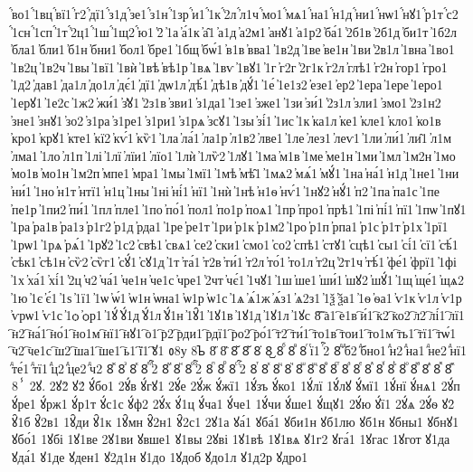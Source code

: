 {҆́во1
҆́1вц
҆́вї1
҆́г2
҆́дї1
҆́з1д
҆́зе1
҆́з1н
҆́1зр
҆́и1
҆́1к
҆́2л
҆́л1ч
҆́мо1
҆́мѧ1
҆́на1
҆́н1д
҆́ни1
҆́нѡ1
҆́нꙋ1
҆́р1т
҆́с2
҆́1сн
҆́1сп
҆́1т
҆́2ц1
҆́1ш
҆́1щ2
҆́ю1
҆2̑
҆1а
҆а́1к
҆а̑1
҆а1д
҆а2м1
҆анꙋ1
҆а1р2
҆ба́1
҆2б1в
҆2б1д
҆би1т
҆1б2л
҆бла1
҆бли1
҆б1н
҆бни1
҆бол1
҆бре1
҆1бщ
҆бѡ́1
҆в1в
҆вва1
҆1в2д
҆1ве
҆ве1н
҆1ви
҆2в1л
҆1вна
҆1во1
҆1в2ц
҆1в2ч
҆1вы
҆1вї1
҆1вѝ
҆1вѣ
҆вѣ1р
҆1вѧ
҆1вѵ
҆1вꙋ1
҆1г
҆г2г
҆2г1к
҆г2л
҆глѣ1
҆г2н
҆гор1
҆гро1
҆1д2
҆дав1
҆да1л
҆до1л
҆дє́1
҆дї1
҆дѡ1л
҆дѣ́1
҆дѣ1в
҆дꙋ́1
҆1е́
҆1е1з2
҆езе1
҆ер2
҆1ера
҆1ере
҆1еро1
҆1ерꙋ1
҆1е2с
҆1ж2
҆жи́1
҆з̾ꙋ1
҆2з1в
҆зви1
҆з1да1
҆1зе1
҆зже1
҆1зи
҆зи́1
҆2з1л
҆зли1
҆змо1
҆2з1н2
҆зне1
҆знꙋ1
҆зо2
҆з1ра
҆з1ре1
҆з1ри1
҆з1рѧ
҆зсꙋ1
҆1зы
҆зі́1
҆1ис
҆1к
҆ка1л
҆ке1
҆кле1
҆кло1
҆ко1в
҆кро1
҆крꙋ1
҆кте1
҆кї2
҆кѵ́1
҆кѷ1
҆1ла
҆ла́1
҆ла1р
҆л1в2
҆лве1
҆1ле
҆лез1
҆леѵ1
҆1ли
҆ли́1
҆ли̑1
҆л1м
҆лма1
҆1ло
҆л1п
҆1лі
҆1лї
҆лїи1
҆лїо1
҆1лѝ
҆1лѷ2
҆1лꙋ1
҆1ма
҆м1в
҆1ме
҆ме1н
҆1ми
҆1мл
҆1м2н
҆1мо
҆мо1в
҆мо1н
҆1м2п
҆мпе1
҆мра1
҆1мы
҆1мї1
҆1мѣ
҆мѣ̑1
҆1мѧ2
҆мѧ́1
҆мꙋ́1
҆1на
҆на́1
҆н1д
҆1не1
҆1ни
҆ни́1
҆1но
҆н1т
҆нтї1
҆н1ц
҆1ны
҆1ні
҆ні́1
҆нї1
҆1нѝ
҆1нѣ
҆н1ѳ
҆нѵ́1
҆1нꙋ2
҆нꙋ́1
҆п2
҆1па
҆па1с
҆1пе
҆пе1р
҆1пи2
҆пи́1
҆1пл
҆пле1
҆1по
҆по́1
҆пол1
҆по1р
҆поѧ1
҆1пр
҆про1
҆прѣ1
҆1пі
҆пі́1
҆пї1
҆1пѡ
҆1пꙋ1
҆1ра
҆ра1в
҆ра1з
҆р1г2
҆р1д
҆рда1
҆1ре
҆ре1т
҆1ри
҆р1к
҆р1м2
҆1ро
҆р1п
҆рпа1
҆р1с
҆р1т
҆р1х
҆1рї1
҆1рѡ1
҆1рѧ
҆рѧ́1
҆1рꙋ2
҆1с2
҆свѣ1
҆свѧ1
҆се2
҆ски1
҆смо1
҆со2
҆спѣ1
҆стꙋ1
҆сцѣ1
҆сы1
҆сі́1
҆сї1
҆сѣ́1
҆сѣк1
҆сѣ1н
҆сѷ2
҆сѷг1
҆сꙋ́1
҆сꙋ1д
҆1т
҆та́1
҆т2в
҆ти́1
҆т2л
҆то́1
҆то1л
҆т2ц
҆2т1ч
҆тѣ́1
҆фе́1
҆фрї1
҆1фі
҆1х
҆ха́1
҆хі́1
҆2ц
҆ч2
҆ча́1
҆че1н
҆че1с
҆чре1
҆2чт
҆чє́1
҆1чꙋ1
҆1ш
҆ше1
҆ши́1
҆шꙋ2
҆шꙋ́1
҆1щ
҆ще́1
҆щѧ2
҆1ю
҆1є
҆є́1
҆1ѕ
҆1ї1
҆1ѡ
҆ѡ́1
҆ѡ1н
҆ѡна1
҆ѡ1р
҆ѡ1с
҆1ѧ
҆ѧ́1ж
҆ѧ́з1
҆ѧ2з1
҆1ѯ
҆ѯа1
҆1ѳ
҆ѳа1
҆ѵ1к
҆ѵ1л
҆ѵ1р
҆ѵрѡ1
҆ѵ1с
҆1ѻ
҆ѻр1
҆1ꙋ́
҆ꙋ́1д
҆ꙋ́1л
҆ꙋ́1н
҆1ꙋ̑1
҆1ꙋ1в
҆1ꙋ1д
҆1ꙋ1л
҆1ꙋс
8҇
҇а1
҇е1в
҇и́1
҇к2
҇ко2
҇л2
҇лі́1
҇лї1
҇н2
҇на́1
҇но́1
҇но1м
҇нї1
҇нꙋ1
҇о1
҇р2
҇рди1
҇рдї1
҇ро2
҇ро́1
҇т2
҇ти́1
҇то1в
҇тои1
҇то1м
҇ть1
҇тї1
҇тѡ́1
҇ч2
҇че1с
҇ш2
҇ша1
҇ше1
҇ь1
҇ї1
҇ꙋ1
ᲂ8у  
8ᲆ
8᷀
8᷁
8᷶
8᷷
8᷸
8᷹
8ⷠ
8ⷡ
8ⷢ
ⷢї1
ⷢ҇2
8ⷣ
ⷣб2
ⷣбно1
ⷣн2
ⷣна1
ⷣне2
ⷣнї1
ⷣте́1
ⷣтї1
ⷣц2
ⷣце2
ⷣч2
8ⷤ
8ⷥ
8ⷦ
8ⷧ
ⷧ҇2
8ⷨ
8ⷩ
8ⷪ
ⷪ҇2
8ⷫ
8ⷬ
8ⷭ
ⷭ҇2
8ⷮ
8ⷯ
8ⷰ
8ⷱ
8ⷲ
8ⷳ
8ⷴ
8ⷵ
8ⷶ
8ⷷ
8ⷸ
8ⷹ
8ⷺ
8ⷻ
8ⷼ
8ⷽ
8ⷾ
8ⷿ
8ⸯ
2ꙋ.
2ꙋ2̀
ꙋ2́
ꙋ́бо1
2ꙋ́в
ꙋ́гꙋ1
2ꙋ́е
2ꙋ́ж
ꙋ́жї1
1ꙋ́зъ
ꙋ́ко1
1ꙋ́лї
1ꙋ́лꙋ
ꙋ́мї1
1ꙋ́нї
ꙋ́нѧ1
2ꙋ́п
ꙋ́ре1
ꙋ́рж1
ꙋ́р1т
ꙋ́с1с
ꙋ́ф2
2ꙋ́х
ꙋ́1ц
ꙋ́ча1
ꙋ́че1
1ꙋ́чи
ꙋ́ше1
ꙋ́щꙋ1
2ꙋ́ю
ꙋ́ї1
2ꙋ́ѧ
2ꙋ́ѳ
ꙋ2̑
ꙋ̑1б
ꙋ̑2в1
1ꙋ̑ди
ꙋ̑1к
1ꙋ̑мн
ꙋ̑2н1
ꙋ̑2с1
2ꙋ1а
ꙋа́1
ꙋба́1
ꙋби1н
ꙋб1лю
ꙋб1н
ꙋбны1
ꙋбнꙋ1
ꙋбо́1
1ꙋбі
1ꙋ1ве
2ꙋ1ви
ꙋвше1
ꙋ1вы
2ꙋві
1ꙋ1вѣ
1ꙋ1вѧ
ꙋ1г2
ꙋга́1
1ꙋгас
1ꙋгот
ꙋ1да
ꙋда́1
ꙋ1де
ꙋден1
ꙋ2д1н
ꙋ1до
1ꙋдоб
ꙋдо1л
ꙋ1д2р
ꙋдро1
}
